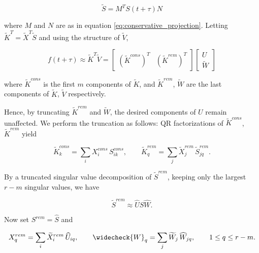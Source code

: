 \begin{equation}
    \widetilde{ S } = M^T S(t + \tau) N
\end{equation}

where $M$ and $N$ are as in equation \ref{eq:conservative_projection}. Letting 
$\widetilde{ K }^T = \widetilde{ X }^T \widetilde{ S }$ and using the structure of 
$\widetilde{ V }$, 

\begin{equation}\label{eq:K_L_step}
    f (t + \tau) \approx \widetilde{ K }^T \widetilde{ V }
    = \begin{bmatrix}
        (\widetilde{ K }^{cons})^T & (\widetilde{ K }^{rem})^T
    \end{bmatrix}
    \begin{bmatrix}
        U \\ 
        \widetilde{ W }
    \end{bmatrix}
\end{equation}

where $\widetilde{ K }^{cons}$ is the first $m$ components of $\widetilde{ K }$, and 
$\widetilde{ K }^{rem}$, $\widetilde{ W }$ are the last components of 
$\widetilde{ K }$, $\widetilde{ V }$ respectively. 

Hence, by truncating $\widetilde{ K }^{rem}$ and $\widetilde{ W }$, the desired 
components of $U$ remain unaffected. We perform the truncation as follows: QR 
factorizations of $\widetilde{ K }^{cons}$, $\widetilde{ K }^{rem}$ yield 

\begin{equation}
    \widetilde{ K }^{cons}_k = \sum_i X^{cons}_i\, S^{cons}_{ i k} , \quad\quad
    \widetilde{ K }^{rem}_q = \sum_j \widetilde{ X }^{rem}_j\, \widetilde{ S }^{rem}_{j q} . 
\end{equation}

By a truncated singular value decomposition of $\widetilde{ S }^{rem}$, keeping only the 
largest $r - m$ singular values, we have 

\begin{equation}
    \widetilde{ S }^{rem} \approx \widehat{ U } \widehat{ S } \widehat{ W } . 
\end{equation}

Now set $S^{rem} = \widehat{ S }$ and 

\begin{equation}
    X^{rem}_q = \sum_i \widetilde{ X }^{rem}_i\, \widehat{ U }_{i q} , \quad\quad 
    \widecheck{ W }_q = \sum_j \widetilde{ W }_j\, \widehat{ W }_{j q} , 
    \quad\quad 1 \leq q \leq r - m . 
\end{equation}

